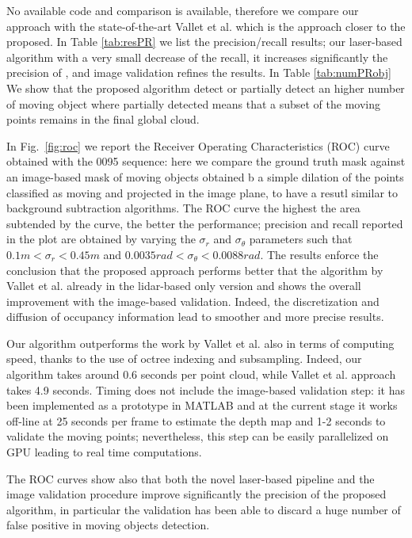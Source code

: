 No available code and comparison is available, therefore we compare our approach with the state-of-the-art Vallet et al. \cite{vallet2015extracting} which is the approach closer to the proposed.
In Table \ref{tab:resPR} we list the precision/recall results; our laser-based algorithm with a very small decrease of the recall, it increases significantly the precision of \cite{vallet2015extracting}, and image validation refines the results.
In Table \ref{tab:numPRobj} We show that the proposed algorithm detect or partially detect an higher number of moving object where  partially detected means that a subset of the moving points remains in the final global cloud.

In Fig.~\ref{fig:roc} we report the Receiver Operating Characteristics (ROC) curve obtained with the 0095 sequence: here we compare the ground truth mask against an image-based mask of moving objects obtained b a simple dilation of the points classified as moving and projected in the image plane, to have a resutl similar to background subtraction algorithms. 
The ROC curve the highest the area subtended by the curve, the better the performance; precision and recall reported in the plot are obtained by varying the $\sigma_r$ and $\sigma_{\theta}$ parameters such that $0.1m<\sigma_r<0.45m$ and $0.0035rad<\sigma_{\theta}<0.0088rad$.
The results enforce the conclusion that the proposed approach performs better that the algorithm by Vallet et al. already in the lidar-based only version and shows the overall improvement with the image-based validation. Indeed, the discretization and diffusion of occupancy information lead to smoother and more precise results.

Our algorithm outperforms the work by Vallet et al. also in terms of computing speed, thanks to the use of octree indexing and subsampling. 
Indeed, our algorithm takes around 0.6 seconds per point cloud, while Vallet et al. approach takes 4.9 seconds.
Timing does not include the image-based validation step: it has been implemented as a prototype in MATLAB and at the current stage it works off-line at 25 seconds per frame to estimate the depth map and 1-2 seconds to validate the moving points; nevertheless, this step can be easily parallelized on GPU leading to real time computations.

The ROC curves show also that both the novel laser-based pipeline and the image validation procedure improve significantly the precision of the proposed algorithm, in particular the validation has been able to discard a huge number of false positive in moving objects detection.

